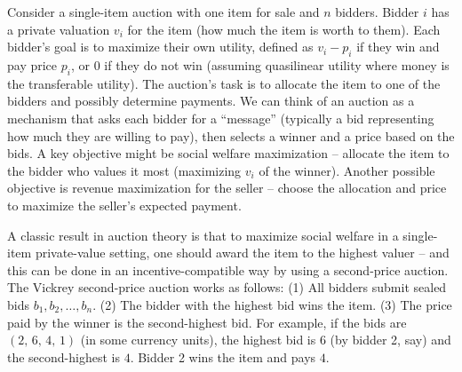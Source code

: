\documentclass[
  letterpaper,
  numbers=noenddot,
  DIV=11]{scrreprt}
\theoremstyle{plain}
\theoremstyle{definition}
\theoremstyle{remark}
\begin{document}
Consider a single-item auction with one item for sale and \(n\) bidders.
Bidder \(i\) has a private valuation \(v_i\) for the item (how much the
item is worth to them). Each bidder's goal is to maximize their own
utility, defined as \(v_i - p_i\) if they win and pay price \(p_i\), or
\(0\) if they do not win (assuming quasilinear utility where money is
the transferable utility). The auction's task is to allocate the item to
one of the bidders and possibly determine payments. We can think of an
auction as a mechanism that asks each bidder for a ``message''
(typically a bid representing how much they are willing to pay), then
selects a winner and a price based on the bids. A key objective might be
social welfare maximization -- allocate the item to the bidder who
values it most (maximizing \(v_i\) of the winner). Another possible
objective is revenue maximization for the seller -- choose the
allocation and price to maximize the seller's expected payment.

A classic result in auction theory is that to maximize social welfare in
a single-item private-value setting, one should award the item to the
highest valuer -- and this can be done in an incentive-compatible way by
using a second-price auction. The Vickrey second-price auction works as
follows: (1) All bidders submit sealed bids \(b_1, b_2, \ldots, b_n\).
(2) The bidder with the highest bid wins the item. (3) The price paid by
the winner is the second-highest bid. For example, if the bids are
\((2,\, 6,\, 4,\, 1)\) (in some currency units), the highest bid is
\(6\) (by bidder 2, say) and the second-highest is \(4\). Bidder 2 wins
the item and pays \(4\).
\end{document}

